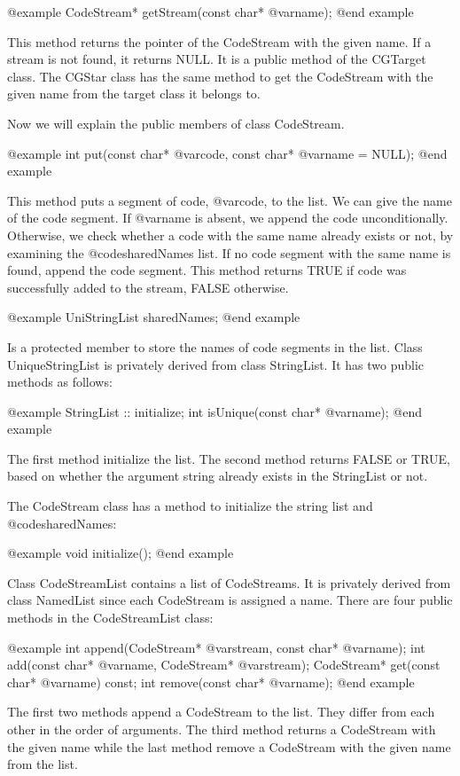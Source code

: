 @example
CodeStream* getStream(const char* @var{name});
@end example

This method returns the pointer of the CodeStream with the given name. If
a stream is not found, it returns NULL. It is a public method of the 
CGTarget class. The CGStar class has the same method to get the
CodeStream with the given name from the target class it belongs to.

Now we will explain the public members of class CodeStream.

@example
int put(const char* @var{code}, const char* @var{name} = NULL);
@end example

This method puts a segment of code, @var{code}, to the list. We can give
the name of the code segment. If @var{name} is absent, we append the code
unconditionally. Otherwise, we check whether a code with the same name
already exists or not, by examining the @code{sharedNames} list. If no
code segment with the same name is found, append the code segment. This
method returns TRUE if code was successfully added to the stream, FALSE
otherwise.

@example
UniStringList sharedNames;
@end example

Is a protected member to store the names of code segments in the list.
Class UniqueStringList is privately derived from class StringList. It has
two public methods as follows:

@example
StringList :: initialize;
int isUnique(const char* @var{name});
@end example

The first method initialize the list. The second method returns FALSE or TRUE,
based on whether the argument string already exists in the StringList or not.

The CodeStream class has a method to initialize the string list and
@code{sharedNames}:

@example
void initialize();
@end example

Class CodeStreamList contains a list of CodeStreams. It is privately
derived from class NamedList since each CodeStream is assigned a name. 
There are four public methods in the CodeStreamList class:

@example
int append(CodeStream* @var{stream}, const char* @var{name});
int add(const char* @var{name}, CodeStream* @var{stream});
CodeStream* get(const char* @var{name}) const;
int remove(const char* @var{name});
@end example

The first two methods append a CodeStream to the list. They differ from
each other in the order of arguments. The third method returns a CodeStream
with the given name while the last method remove a CodeStream with the
given name from the list.

